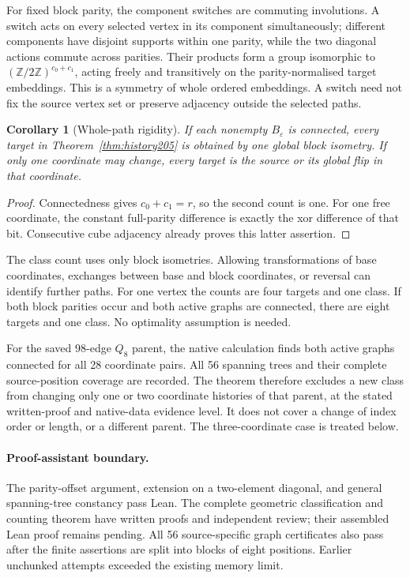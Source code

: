 \documentclass[11pt,a4paper]{article}
\newtheorem{corollary}[theorem]{Corollary}
\theoremstyle{definition}
\theoremstyle{remark}
\begin{document}
For fixed block parity, the component switches are commuting
involutions. A switch acts on every selected vertex in its component
simultaneously; different components have disjoint supports within
one parity, while the two diagonal actions commute across parities.
Their products form a group isomorphic to
$(\mathbb Z/2\mathbb Z)^{c_0+c_1}$, acting freely and transitively
on the parity-normalised target embeddings. This is a symmetry
of whole ordered embeddings. A switch need not fix the source
vertex set or preserve adjacency outside the selected paths.

\begin{corollary}[Whole-path rigidity]
If each nonempty $B_\varepsilon$ is connected, every target in
Theorem~\ref{thm:history205} is obtained by one global block
isometry. If only one coordinate may change, every target is the
source or its global flip in that coordinate.
\end{corollary}
\begin{proof}
Connectedness gives $c_0+c_1=r$, so the second count is one.
For one free coordinate, the constant full-parity difference is
exactly the xor difference of that bit. Consecutive cube adjacency
already proves this latter assertion.
\end{proof}

The class count uses only block isometries. Allowing transformations
of base coordinates, exchanges between base and block coordinates,
or reversal can identify further paths. For one vertex the counts
are four targets and one class. If both block parities occur and
both active graphs are connected, there are eight targets and one
class. No optimality assumption is needed.

For the saved 98-edge $Q_8$ parent, the native calculation finds
both active graphs connected for all 28 coordinate pairs. All 56
spanning trees and their complete source-position coverage are
recorded. The theorem therefore excludes a new class from changing
only one or two coordinate histories of that parent, at the stated
written-proof and native-data evidence level. It does not cover
a change of index order or length, or a different parent. The
three-coordinate case is treated below.

\paragraph{Proof-assistant boundary.}
The parity-offset argument, extension on a two-element diagonal,
and general spanning-tree constancy pass Lean. The complete
geometric classification and counting theorem have written proofs
and independent review; their assembled Lean proof remains pending.
All 56 source-specific graph certificates also pass after the
finite assertions are split into blocks of eight positions. Earlier
unchunked attempts exceeded the existing memory limit.
\end{document}
